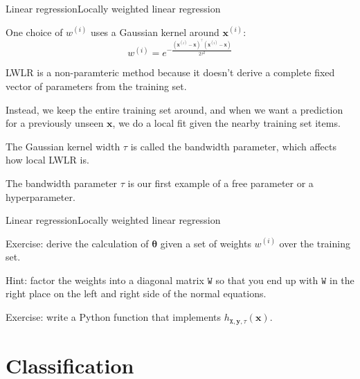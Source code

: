 \documentclass{beamer}
\renewcommand{\vec}[1]{\boldsymbol{#1}}
\newcommand{\mat}[1]{\mathtt{#1}}
\begin{document}
\begin{frame}{Linear regression}{Locally weighted linear regression}

  One choice of $w^{(i)}$ uses a Gaussian \alert{kernel} around $\vec{x}^{(i)}$:
  \[ w^{(i)} = e^{-\frac{(\vec{x}^{(i)}-\vec{x})^\top(\vec{x}^{(i)}-\vec{x})}{2\tau^2}} \]

  \medskip

  LWLR is a \alert{non-paramteric} method because it doesn't derive
  a complete fixed vector of parameters from the training set.

  \medskip

  Instead, we keep the \alert{entire training set} around, and when we
  want a prediction for a previously unseen $\vec{x}$, we do a local
  fit given the nearby training set items.

  \medskip

  The Gaussian kernel width $\tau$ is called the \alert{bandwidth}
  parameter, which affects how local LWLR is.

  \medskip

  The bandwidth parameter $\tau$ is our first example of a \alert{free
    parameter} or a \alert{hyperparameter}.
  
\end{frame}


\begin{frame}{Linear regression}{Locally weighted linear regression}
  
  \alert{Exercise}: derive the calculation of $\vec{\theta}$ given a
  set of weights $w^{(i)}$ over the training set.

  \medskip

  \alert{Hint}: factor the weights into a diagonal matrix $\mat{W}$ so
  that you end up with $\mat{W}$ in the right place on the left and
  right side of the normal equations.

  \medskip

  \alert{Exercise}: write a Python function that implements
  $h_{\mat{X},\vec{y},\tau}(\vec{x})$.
  
\end{frame}

\section{Classification}
\end{document}
